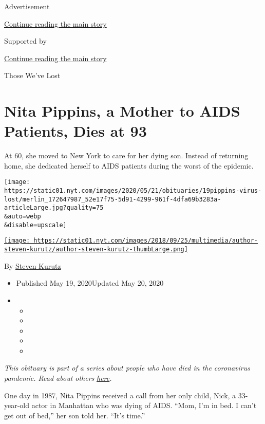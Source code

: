 Advertisement

\protect\hyperlink{after-top}{Continue reading the main story}

Supported by

\protect\hyperlink{after-sponsor}{Continue reading the main story}

Those We've Lost

\hypertarget{nita-pippins-a-mother-to-aids-patients-dies-at-93}{%
\section{Nita Pippins, a Mother to AIDS Patients, Dies at
93}\label{nita-pippins-a-mother-to-aids-patients-dies-at-93}}

At 60, she moved to New York to care for her dying son. Instead of
returning home, she dedicated herself to AIDS patients during the worst
of the epidemic.

\texttt{[image: https://static01.nyt.com/images/2020/05/21/obituaries/19pippins-virus-lost/merlin\_172647987\_52e17f75-5d91-4299-961f-4dfa69b3283a-articleLarge.jpg?quality=75\\\&auto=webp\\\&disable=upscale]}

\href{https://www.nytimes.com/by/steven-kurutz}{\texttt{[image: https://static01.nyt.com/images/2018/09/25/multimedia/author-steven-kurutz/author-steven-kurutz-thumbLarge.png]}}

By \href{https://www.nytimes.com/by/steven-kurutz}{Steven Kurutz}

\begin{itemize}
\item
  Published May 19, 2020Updated May 20, 2020
\item
  \begin{itemize}
  \item
  \item
  \item
  \item
  \item
  \end{itemize}
\end{itemize}

\emph{This obituary is part of a series about people who have died in
the coronavirus pandemic. Read about others}
\href{https://www.nytimes.com/series/people-who-have-died-of-the-coronavirus}{\emph{here}}\emph{.}

One day in 1987, Nita Pippins received a call from her only child, Nick,
a 33-year-old actor in Manhattan who was dying of AIDS. ``Mom, I'm in
bed. I can't get out of bed,'' her son told her. ``It's time.''

